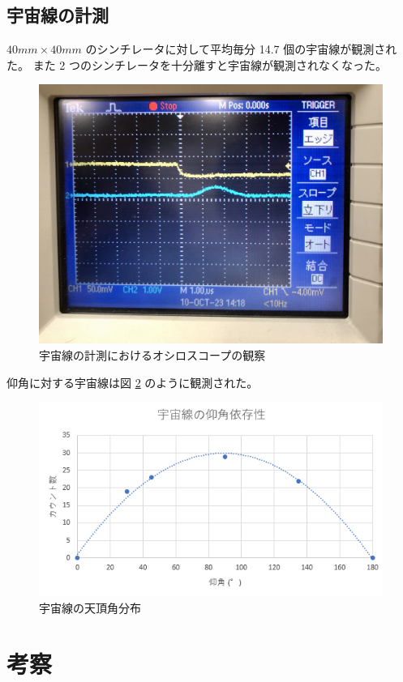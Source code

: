 \documentclass[uplatex,dvipdfmx,a4paper,11pt]{jlreq}
\numberwithin{equation}{section}
\theoremstyle{definition}
\begin{document}
\subsection{宇宙線の計測}
$40\si{mm}\times 40\si{mm}$ のシンチレータに対して平均毎分 14.7 個の宇宙線が観測された。
また 2 つのシンチレータを十分離すと宇宙線が観測されなくなった。
\begin{figure}[htbp]
  \centering
  \includegraphics[width=12cm]{./assets/trigger3.jpg}
  \caption{宇宙線の計測におけるオシロスコープの観察}
  \label{fig:trigger 3}
\end{figure}
仰角に対する宇宙線は図 \ref{fig:cosmic ray angle} のように観測された。
\begin{figure}[htbp]
  \centering
  \includegraphics[width=14cm]{./assets/cosmic_ray_elevation_angle.png}
  \caption{宇宙線の天頂角分布}
  \label{fig:cosmic ray angle}
\end{figure}



\section{考察}
\end{document}
